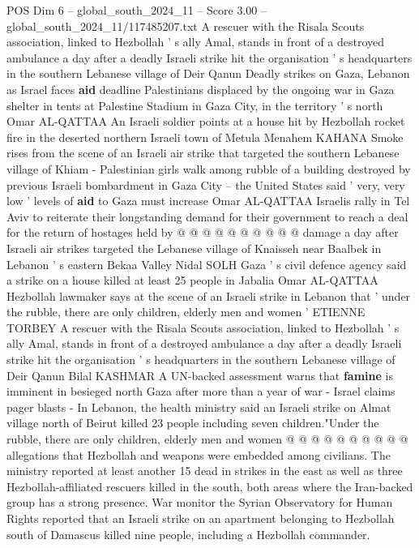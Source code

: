 \begin{textsample}{POS Dim 6 – global\_south\_2024\_11 – Score 3.00 – global\_south\_2024\_11/117485207.txt}  \label{ex:f6_pos_339}
A rescuer with the Risala Scouts association, linked to Hezbollah ' s ally Amal, stands in front of a destroyed ambulance a day after a deadly Israeli strike hit the organisation ' s headquarters in the southern Lebanese village of Deir Qanun Deadly strikes on Gaza, Lebanon as Israel faces \textbf{aid} deadline Palestinians displaced by the ongoing war in Gaza shelter in tents at Palestine Stadium in Gaza City, in the territory ' s north Omar AL-QATTAA An Israeli soldier points at a house hit by Hezbollah rocket fire in the deserted northern Israeli town of Metula Menahem KAHANA Smoke rises from the scene of an Israeli air strike that targeted the southern Lebanese village of Khiam - Palestinian girls walk among rubble of a building destroyed by previous Israeli bombardment in Gaza City -- the United States said ' very, very low ' levels of \textbf{aid} to Gaza must increase Omar AL-QATTAA Israelis rally in Tel Aviv to reiterate their longstanding demand for their government to reach a deal for the return of hostages held by @ @ @ @ @ @ @ @ @ @ damage a day after Israeli air strikes targeted the Lebanese village of Knaisseh near Baalbek in Lebanon ' s eastern Bekaa Valley Nidal SOLH Gaza ' s civil defence agency said a strike on a house killed at least 25 people in Jabalia Omar AL-QATTAA Hezbollah lawmaker says at the scene of an Israeli strike in Lebanon that ' under the rubble, there are only children, elderly men and women ' ETIENNE TORBEY A rescuer with the Risala Scouts association, linked to Hezbollah ' s ally Amal, stands in front of a destroyed ambulance a day after a deadly Israeli strike hit the organisation ' s headquarters in the southern Lebanese village of Deir Qanun Bilal KASHMAR A UN-backed assessment warns that \textbf{famine} is imminent in besieged north Gaza after more than a year of war - Israel claims pager blasts - In Lebanon, the health ministry said an Israeli strike on Almat village north of Beirut killed 23 people including seven children."Under the rubble, there are only children, elderly men and women @ @ @ @ @ @ @ @ @ @ allegations that Hezbollah and weapons were embedded among civilians.
The ministry reported at least another 15 dead in strikes in the east as well as three Hezbollah-affiliated rescuers killed in the south, both areas where the Iran-backed group has a strong presence.
War monitor the Syrian Observatory for Human Rights reported that an Israeli strike on an apartment belonging to Hezbollah south of Damascus killed nine people, including a Hezbollah commander.

\end{textsample}
